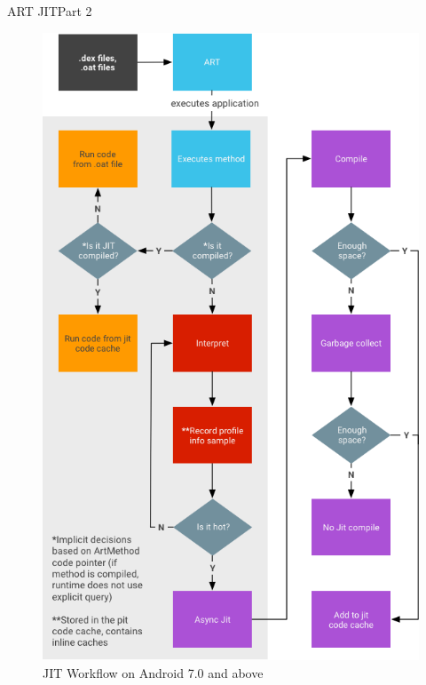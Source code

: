 \begin{frame}[fragile]{ART JIT}{Part 2}

\begin{figure}[H]
	\begin{center}
	\vspace*{-2cm}
		\includegraphics[scale=0.3]{figures/jit-workflow.png}
	\end{center}
	\caption{JIT Workflow on Android 7.0 and above \cite{JitWorkFlow}}
	\label{JitWorkflow}
\end{figure}


\end{frame}


